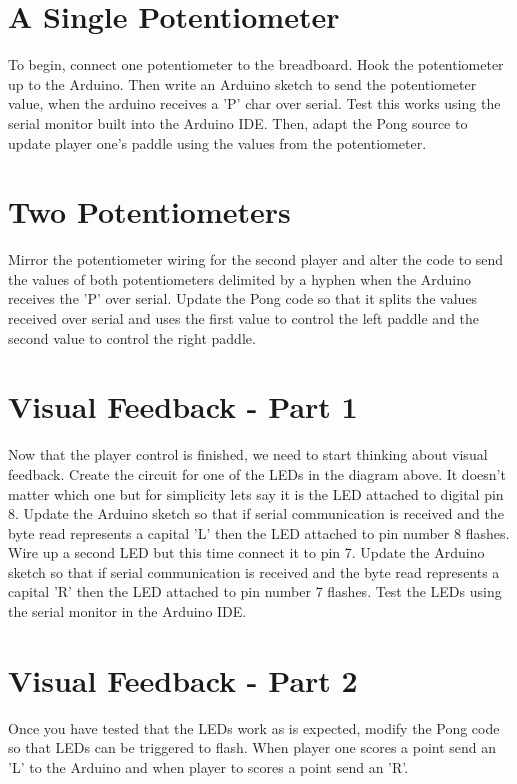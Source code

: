 \documentclass{../../../fal_assignment}
\begin{document}
\section{A Single Potentiometer} \label{arduino-first}
To begin, connect one potentiometer to the breadboard. Hook the potentiometer up to the Arduino. Then write an Arduino sketch to send the potentiometer value, when the arduino receives a 'P' char over serial. Test this works using the serial monitor built into the Arduino IDE. Then, adapt the Pong source to update player one's paddle using the values from the potentiometer. 

\section{Two Potentiometers} \label{arduino-second}
Mirror the potentiometer wiring for the second player and alter the code to send the values of both potentiometers delimited by a hyphen when the Arduino receives the 'P' over serial. Update the Pong code so that it splits the values received over serial and uses the first value to control the left paddle and the second value to control the right paddle. 

\section{Visual Feedback - Part 1} \label{arduino-third}
Now that the player control is finished, we need to start thinking about visual feedback. Create the circuit for one of the LEDs in the diagram above. It doesn't matter which one but for simplicity lets say it is the LED attached to digital pin 8. Update the Arduino sketch so that if serial communication is received and the byte read represents a capital 'L' then the LED attached to pin number 8 flashes. Wire up a second LED but this time connect it to pin 7. Update the Arduino sketch so that if serial communication is received and the byte read represents a capital 'R' then the LED attached to pin number 7 flashes. Test the LEDs using the serial monitor in the Arduino IDE. 

\section{Visual Feedback - Part 2} \label{arduino-fourth}
Once you have tested that the LEDs work as is expected, modify the Pong code so that LEDs can be triggered to flash. When player one scores a point send an 'L' to the Arduino and when player to scores a point send an 'R'.
\end{document}
